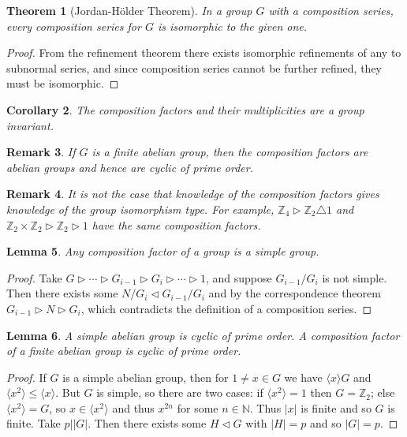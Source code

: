 \documentclass[a4paper,10pt]{article}
\newcommand{\NN}{\mathbb{N}}
\newcommand{\ZZ}{\mathbb{Z}}
\newtheorem{thm}{Theorem}
\newtheorem{Cor}[thm]{Corollary}
\newtheorem{Lem}[thm]{Lemma}
\newtheorem{rem}[thm]{Remark}
\begin{document}
\begin{thm}[Jordan-H\"{o}lder Theorem]
In a group $G$ with a composition series, every composition series for $G$ is isomorphic to the given one.
\end{thm}
\begin{proof}
From the refinement theorem there exists isomorphic refinements of any to subnormal series, and since composition series cannot be further refined, they must be isomorphic.
\end{proof}

\begin{Cor}
The composition factors and their multiplicities are a group invariant. 
\end{Cor}

\begin{rem}
If $G$ is a finite abelian group, then the composition factors are abelian groups and hence are cyclic of prime order.
\end{rem}

\begin{rem}
It is not the case that knowledge of the composition factors gives knowledge of the group isomorphism type. For example, $\ZZ_4 \triangleright \ZZ_2 \triangle 1$ and $\ZZ_2 \times \ZZ_2 \triangleright \ZZ_2 \triangleright 1$ have the same composition factors.
\end{rem}


\begin{Lem}
Any composition factor of a group is a simple group. 
\end{Lem}
\begin{proof}
Take $G \triangleright \cdots \triangleright G_{i-1} \triangleright G_i \triangleright \cdots \triangleright 1$, and suppose $G_{i-1} / G_i$ is not simple. Then there exists some $N / G_{i} \triangleleft G_{i-1} / G_i$ and by the correspondence theorem $G_{i-1} \triangleright N \triangleright G_i$, which contradicts the definition of a composition series.
\end{proof}

\begin{Lem}
A simple abelian group is cyclic of prime order. A composition factor of a finite abelian group is cyclic of prime order.
\end{Lem}

\begin{proof}
If $G$ is a simple abelian group, then for $1 \neq x \in G$ we have $\langle x \rangle G$ and $\langle x^2 \rangle \leq \langle x \rangle$. But $G$ is simple, so there are two cases: if $\langle x^2 \rangle  = 1$ then $G = \ZZ_2$; else $\langle x^2 \rangle = G$, so $x \in \langle x^2 \rangle$ and thus $x^{2n}$ for some $n \in \NN$. Thus $|x|$ is finite and so $G$ is finite. Take $p | |G|$. Then there exists some $H \triangleleft G$ with $|H| = p$ and so $|G| = p$.
\end{proof}
\end{document}
